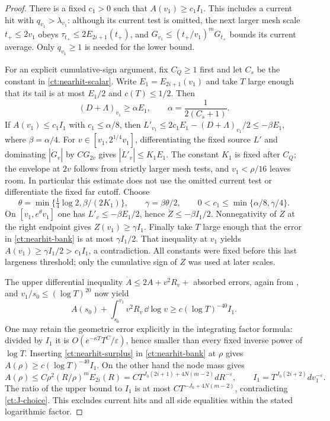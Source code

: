 \begin{proof}
There is a fixed $c_1>0$ such that $A(v_1)\ge c_1I_1$.
This includes a current hit with $q_{v_1}>\lambda_{v_1}$: although
its current test is omitted, the next larger mesh scale $t_+\le2v_1$
obeys $\tau_{t_+}\le2E_{2i+1}(t_+)$, and
$G_{v_1}\le(t_+/v_1)^mG_{t_+}$ bounds its current average.
Only $q_{v_1}\ge1$ is needed for the lower bound.

For an explicit cumulative-sign argument, fix $C_Q\ge1$ first and
let $C_s$ be the constant in \eqref{ct:nearhit-scalar}.  Write
$E_1=E_{2i+1}(v_1)$ and take $T$ large enough that its tail is at
most $E_1/2$ and $c(T)\le1/2$.  Then
\[
 (D+\Lambda)_{v_1}\ge\alpha E_1,
 \qquad \alpha=\frac{1}{2(C_s+1)}.
\]
If $A(v_1)\le c_1I_1$ with $c_1\le\alpha/8$, then
$L'_{v_1}\le2c_1E_1-(D+\Lambda)_{v_1}/2\le-\beta E_1$,
where $\beta=\alpha/4$.  For
$v\in[v_1,2^{1/4}v_1]$, differentiating the fixed source $L'$
and dominating $|\dot G_v|$ by $CG_{2v}$ gives
$|\dot L'_v|\le K_1E_1$.  The constant $K_1$ is fixed after $C_Q$;
the envelope at $2v$ follows from strictly larger mesh tests, and
$v_1<\rho/16$ leaves room.  In particular this estimate does not
use the omitted current test or differentiate the fixed far cutoff.
Choose
\[
 \theta=\min\{\tfrac14\log2,\beta/(2K_1)\},\qquad
 \gamma=\beta\theta/2,\qquad
 0<c_1\le\min\{\alpha/8,\gamma/4\}.
\]
On $[v_1,e^\theta v_1]$ one has $L'_v\le-\beta E_1/2$,
hence $\dot Z\le-\beta I_1/2$.  Nonnegativity of $Z$ at the
right endpoint gives $Z(v_1)\ge\gamma I_1$.
Finally take $T$ large enough that the error in
\eqref{ct:nearhit-bank} is at most $\gamma I_1/2$.
That inequality at $v_1$ yields $A(v_1)\ge\gamma I_1/2>c_1I_1$,
a contradiction.  All constants were fixed before this last largeness
threshold; only the cumulative sign of $Z$ was used at later scales.

The upper differential inequality
$\dot A\le2A+v^2R_v+$ absorbed errors, again from
, and $v_1/s_0\le(\log T)^{20}$ now yield
\begin{equation}\label{ct:nearhit-surplus}
 A(s_0)+\int_{s_0}^{v_1}v^2R_v\,\dd\log v
 \ge c(\log T)^{-40}I_1.
\end{equation}
One may retain the geometric error explicitly in the integrating
factor formula: divided by $I_1$ it is
$O(e^{-\kappa T}T^C/\varepsilon)$, hence smaller than every fixed
inverse power of $\log T$.  Inserting
\eqref{ct:nearhit-surplus} in \eqref{ct:nearhit-bank} at $\rho$
gives $A(\rho)\ge c(\log T)^{-40}I_1$.  On the other hand the
node mass gives
\[
 A(\rho)\le C\rho^2(R/\rho)^m E_{2i}(R)
   = C T^{J_0(2i+1)+4N(m-2)}dR^{-\varepsilon},
 \qquad I_1=T^{J_0(2i+2)}dv_1^{-\varepsilon}.
\]
The ratio of the upper bound to $I_1$ is at most
$CT^{-J_0+4N(m-2)}$, contradicting \eqref{ct:J-choice}.
This excludes current hits and all side equalities within the stated
logarithmic factor.


\end{proof}
